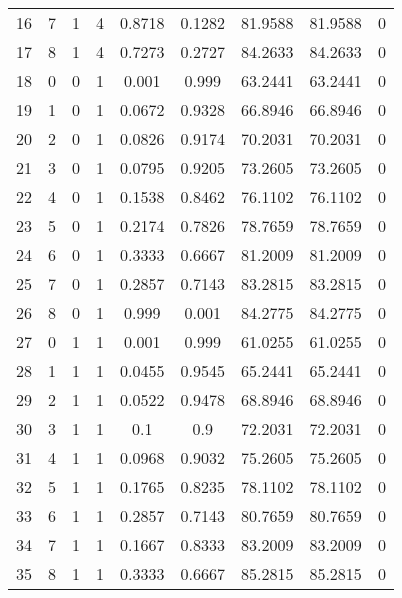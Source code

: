 \documentclass[12pt,english]{article}
\begin{document}
\begin{table}[]
\begin{tabular}{|c|c|c|c|c|c|c|c|c|}
16 & 7 & 1 & 4 & 0.8718 & 0.1282 & 81.9588 & 81.9588 & 0        \\
17 & 8 & 1 & 4 & 0.7273 & 0.2727 & 84.2633 & 84.2633 & 0        \\
18 & 0 & 0 & 1 & 0.001  & 0.999  & 63.2441 & 63.2441 & 0        \\
19 & 1 & 0 & 1 & 0.0672 & 0.9328 & 66.8946 & 66.8946 & 0        \\
20 & 2 & 0 & 1 & 0.0826 & 0.9174 & 70.2031 & 70.2031 & 0        \\
21 & 3 & 0 & 1 & 0.0795 & 0.9205 & 73.2605 & 73.2605 & 0        \\
22 & 4 & 0 & 1 & 0.1538 & 0.8462 & 76.1102 & 76.1102 & 0        \\
23 & 5 & 0 & 1 & 0.2174 & 0.7826 & 78.7659 & 78.7659 & 0        \\
24 & 6 & 0 & 1 & 0.3333 & 0.6667 & 81.2009 & 81.2009 & 0        \\
25 & 7 & 0 & 1 & 0.2857 & 0.7143 & 83.2815 & 83.2815 & 0        \\
26 & 8 & 0 & 1 & 0.999  & 0.001  & 84.2775 & 84.2775 & 0        \\
27 & 0 & 1 & 1 & 0.001  & 0.999  & 61.0255 & 61.0255 & 0        \\
28 & 1 & 1 & 1 & 0.0455 & 0.9545 & 65.2441 & 65.2441 & 0        \\
29 & 2 & 1 & 1 & 0.0522 & 0.9478 & 68.8946 & 68.8946 & 0        \\
30 & 3 & 1 & 1 & 0.1    & 0.9    & 72.2031 & 72.2031 & 0        \\
31 & 4 & 1 & 1 & 0.0968 & 0.9032 & 75.2605 & 75.2605 & 0        \\
32 & 5 & 1 & 1 & 0.1765 & 0.8235 & 78.1102 & 78.1102 & 0        \\
33 & 6 & 1 & 1 & 0.2857 & 0.7143 & 80.7659 & 80.7659 & 0        \\
34 & 7 & 1 & 1 & 0.1667 & 0.8333 & 83.2009 & 83.2009 & 0        \\
35 & 8 & 1 & 1 & 0.3333 & 0.6667 & 85.2815 & 85.2815 & 0 \\
\hline
\end{tabular}

\end{table}
\end{document}
